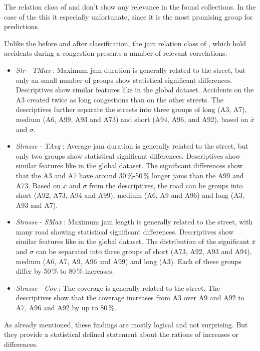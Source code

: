 The relation class of  and  don't show any relevance in the found collections. In the case of the  this it especially unfortunate, since it is the most promising group for predictions.

Unlike the before and after classification, the jam relation class of , which hold accidents during a congestion presents a number of relevant correlations:
\begin{itemize}
    \item \textit{Str} - \textit{TMax} : Maximum jam duration is generally related to the street, but only an small number of groups show statistical significant differences. Descriptives show similar features like in the global dataset. Accidents on the A3 created twice as long congestions than on the other streets. The descriptives further separate the streets into three groups of long (A3, A7), medium (A6, A99, A93 and A73) and short (A94, A96, and A92), based on $\bar{x}$ and $\sigma$.
    \item \textit{Strasse} - \textit{TAvg} : Average jam duration is generally related to the street, but only two groups show statistical significant differences. Descriptives show similar features like in the global dataset. The significant differences show that the A3 and A7 have around 30\,\%-50\,\% longer jams than the A99 and A73. Based on $\bar{x}$ and $\sigma$ from the descriptives, the road can be groups into short (A92, A73, A94 and A99), medium (A6, A9 and A96) and long (A3, A93 and A7).
    \item \textit{Strasse} - \textit{SMax} : Maximum jam length is generally related to the street, with many road showing statistical significant differences. Descriptives show similar features like in the global dataset. The distribution of the significant $\bar{x}$ and $\sigma$ can be separated into three groups of short (A73, A92, A93 and A94), medium (A6, A7, A9, A96 and A99) and long (A3). Each of these groups differ by 50\,\% to 80\,\% increases.
    \item \textit{Strasse} - \textit{Cov} : The coverage is generally related to the street. The descriptives show that the coverage increases from A3 over A9 and A92 to A7, A96 and A92 by up to 80\,\%.
\end{itemize}
As already mentioned, these findings are mostly logical and not surprising. But they provide a statistical defined statement about the rations of increases or differences. 

